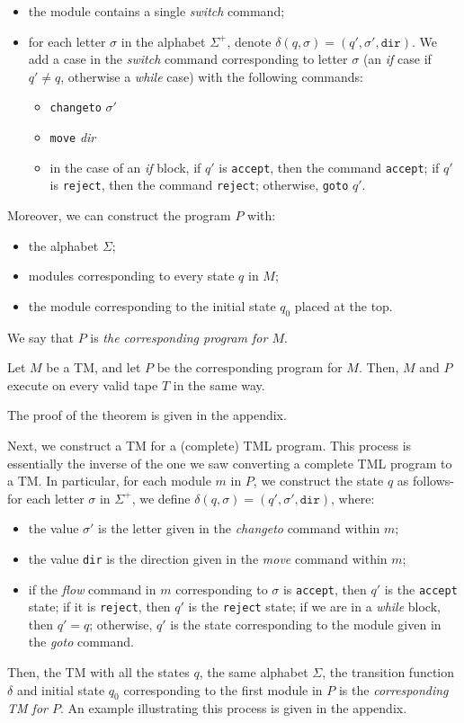 \begin{itemize}
    \item the module contains a single \textit{switch} command;
    \item for each letter $\sigma$ in the alphabet $\Sigma^+$, denote $\delta(q, \sigma) = (q', \sigma', \texttt{dir})$. We add a case in the \textit{switch} command corresponding to letter $\sigma$ (an \textit{if} case if $q' \neq q$, otherwise a \textit{while} case) with the following commands:
    \begin{itemize}
        \item \texttt{changeto} $\sigma'$
        \item \texttt{move} \textit{dir}
        \item in the case of an \textit{if} block, if $q'$ is \texttt{accept}, then the command \texttt{accept}; if $q'$ is \texttt{reject}, then the command \texttt{reject}; otherwise, \texttt{goto} $q'$.
    \end{itemize}
\end{itemize}
Moreover, we can construct the program $P$ with:
\begin{itemize}
    \item the alphabet $\Sigma$;
    \item modules corresponding to every state $q$ in $M$;
    \item the module corresponding to the initial state $q_0$ placed at the top.
\end{itemize}
We say that $P$ is \emph{the corresponding program for $M$}.

\begin{theorem}
    Let $M$ be a TM, and let $P$ be the corresponding program for $M$. Then, $M$ and $P$ execute on every valid tape $T$ in the same way. 
\end{theorem}
The proof of the theorem is given in the appendix.

Next, we construct a TM for a (complete) TML program. This process is essentially the inverse of the one we saw converting a complete TML program to a TM. In particular, for each module $m$ in $P$, we construct the state $q$ as follows- for each letter $\sigma$ in $\Sigma^+$, we define $\delta(q, \sigma) = (q', \sigma', \texttt{dir})$, where:
\begin{itemize}
    \item the value $\sigma'$ is the letter given in the \textit{changeto} command within $m$;
    \item the value \texttt{dir} is the direction given in the \textit{move} command within $m$;
    \item if the \textit{flow} command in $m$ corresponding to $\sigma$ is \texttt{accept}, then $q'$ is the \texttt{accept} state; if it is \texttt{reject}, then $q'$ is the \texttt{reject} state; if we are in a \textit{while} block, then $q' = q$; otherwise, $q'$ is the state corresponding to the module given in the \textit{goto} command.
\end{itemize}
Then, the TM with all the states $q$, the same alphabet $\Sigma$, the transition function $\delta$ and initial state $q_0$ corresponding to the first module in $P$ is the \emph{corresponding TM for $P$}. An example illustrating this process is given in the appendix.

